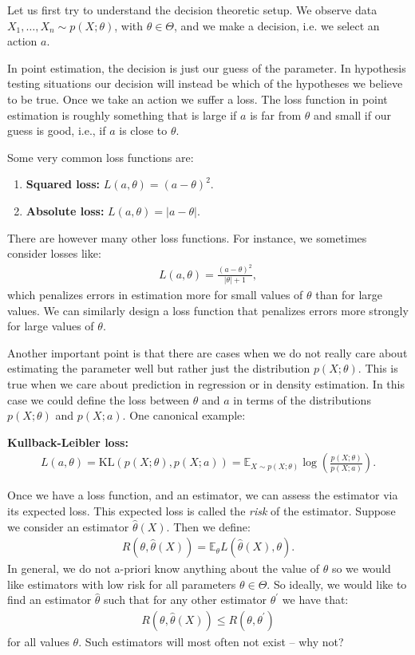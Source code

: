\documentclass[twoside,12pt]{article}
\begin{document}
Let us first try to understand the decision theoretic setup. We observe data $X_1,\ldots,X_n
\sim p(X;\theta)$, with $\theta \in \Theta$, and we make a decision,
i.e. we select an action $a$. 

In point estimation, the decision is just our guess of the parameter. In hypothesis 
testing situations our decision will instead be which of the hypotheses we believe to be true.
Once we take an action we suffer a loss. The loss function in point estimation is roughly something
that is large if $a$ is far from $\theta$ and small if our guess is good, i.e., 
if $a$ is close to $\theta$.

Some very common loss functions are:
\begin{enumerate}
\item {\bf Squared loss: } $L(a,\theta) = (a - \theta)^2$. 
\item {\bf Absolute loss: } $L(a,\theta) = |a - \theta|$.
\end{enumerate}
There are however many other loss functions.
For instance, we sometimes consider losses like:
\begin{align*}
L(a, \theta) = \frac{(a - \theta)^2}{|\theta| + 1},
\end{align*}
which penalizes errors in estimation more for small values of $\theta$ than for large values. We can
similarly design a loss function that penalizes errors more strongly for large values of $\theta$.

Another important point is that there are cases when we do not really care about estimating the parameter well but rather just the distribution $p(X;\theta)$. This is true when we care about prediction in 
regression or in density estimation. In this case we could define the loss between 
$\theta$ and $a$ in terms of the distributions $p(X;\theta)$ and $p(X;a)$. One canonical example:

{\bf Kullback-Leibler loss: } 
\begin{align*}
L(a,\theta) = \mathrm{KL}(p(X;\theta), p(X;a)) = \mathbb{E}_{X \sim p(X;\theta)} \log \left( \frac{p(X;\theta)}{p(X;a)} \right). 
\end{align*}

Once we have a loss function, and an estimator, we can assess the estimator via its
expected loss. This expected loss is called the \emph{risk} of the estimator. Suppose
we consider an estimator $\widehat{\theta}(X)$. Then we define:
\begin{align*}
R(\theta,\widehat{\theta}(X)) = \mathbb{E}_{\theta} L(\widehat{\theta}(X),\theta).
\end{align*}
In general, we do not a-priori know anything about the value of $\theta$ so we 
would like estimators with low risk for all parameters $\theta \in \Theta$.
So ideally, we would like to find an estimator $\widehat{\theta}$ such that for
any other estimator $\theta^{\prime}$ we have that:
\begin{align*}
R(\theta, \widehat{\theta}(X)) \leq R(\theta,\theta^{\prime})
\end{align*}
for all values $\theta$. Such estimators will most often not exist -- why not?
\end{document}
